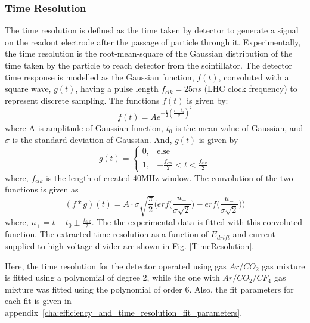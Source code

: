 \subsubsection{Time Resolution}
The time resolution is defined as the time taken by detector to generate a signal on the readout electrode after the passage of particle through it.
Experimentally, the time resolution is the root-mean-square of the Gaussian distribution of the time taken by the particle to reach detector from the scintillator.
The detector time response is modelled as the Gaussian function, $f(t)$, convoluted with a square wave, $g(t)$, having a pulse length $f_{clk}=25ns$ (LHC clock frequency) to represent discrete sampling. 
The functions $f(t)$ is given by:
\begin{equation}
f(t) = Ae^{-\frac{1}{2}(\frac{t-t_0}{\sigma})^2}
\end{equation}
where A is amplitude of Gaussian function, $t_0$  is the mean value of Gaussian, and $\sigma$ is the standard deviation of Gaussian. And, $g(t)$ is given by
\begin{equation}
g(t) =
      \begin{cases}
              0, & \text{else} \\
              1, & \text{$-\frac{f_{clk}}{2}<t<\frac{f_{clk}}{2}$}
      \end{cases}
\end{equation}
where, $f_{clk}$ is the length of created 40MHz window.
The convolution of the two functions is given as
\begin{equation}
(f*g)(t) = A \cdot \sigma \sqrt{\frac{\pi}{2}}\Big(erf\Big(\frac{u_{+}}{\sigma\sqrt{2}}\Big)-erf\Big(\frac{u_{-}}{\sigma\sqrt{2}}\Big)\Big)
\end{equation}
where, $u_{\pm}= t-t_0\pm\frac{f_{clk}}{2}$. 
The the experimental data is fitted with this convoluted function.
The extracted time resolution as a function of $E_{drift}$ and current supplied to high voltage divider are shown in Fig. \ref{TimeResolution}. 

Here, the time resolution for the detector operated using gas $Ar/CO_2$ gas mixture is fitted using a polynomial of degree 2, while the one with $Ar/CO_2/CF_4$ gas mixture was fitted using the polynomial of order 6. Also, the fit parameters for each fit is given in appendix~\ref{cha:efficiency_and_time_resolution_fit_parameters}.

